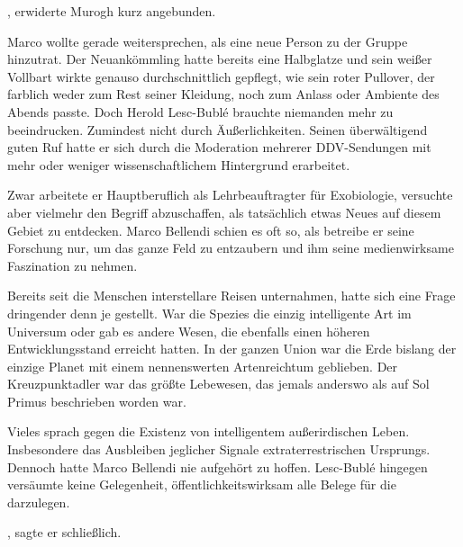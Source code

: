 \par

, erwiderte Murogh kurz angebunden.

\par

Marco wollte gerade weitersprechen, als eine neue Person zu der Gruppe hinzutrat. Der Neuankömmling hatte bereits eine Halbglatze und sein weißer Vollbart wirkte genauso durchschnittlich gepflegt, wie sein roter Pullover, der farblich weder zum Rest seiner Kleidung, noch zum Anlass oder Ambiente des Abends passte. Doch Herold Lesc-Bublé brauchte niemanden mehr zu beeindrucken. Zumindest nicht durch Äußerlichkeiten. Seinen überwältigend guten Ruf hatte er sich durch die Moderation mehrerer DDV-Sendungen mit mehr oder weniger wissenschaftlichem Hintergrund erarbeitet.

\par

Zwar arbeitete er Hauptberuflich als Lehrbeauftragter für Exobiologie, versuchte aber vielmehr den Begriff abzuschaffen, als tatsächlich etwas Neues auf diesem Gebiet zu entdecken. Marco Bellendi schien es oft so, als betreibe er seine Forschung nur, um das ganze Feld zu entzaubern und ihm seine medienwirksame Faszination zu nehmen.

\par

Bereits seit die Menschen interstellare Reisen unternahmen, hatte sich eine Frage dringender denn je gestellt. War die Spezies  die einzig intelligente Art im Universum oder gab es andere Wesen, die ebenfalls einen höheren Entwicklungsstand erreicht hatten. In der ganzen Union war die Erde bislang der einzige Planet mit einem nennenswerten Artenreichtum geblieben. Der Kreuzpunktadler war das größte Lebewesen, das jemals anderswo als auf Sol Primus beschrieben worden war.

\par

Vieles sprach gegen die Existenz von intelligentem außerirdischen Leben. Insbesondere das Ausbleiben jeglicher Signale extraterrestrischen Ursprungs. Dennoch hatte Marco Bellendi nie aufgehört zu hoffen. Lesc-Bublé hingegen versäumte keine Gelegenheit, öffentlichkeitswirksam alle Belege für die  darzulegen.

\par

, sagte er schließlich.


